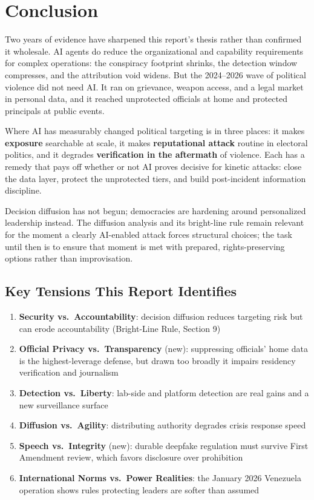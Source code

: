 \documentclass[11pt,letterpaper]{article}
\begin{document}
\section{Conclusion}

Two years of evidence have sharpened this report's thesis rather than confirmed it wholesale. AI agents do reduce the organizational and capability requirements for complex operations: the conspiracy footprint shrinks, the detection window compresses, and the attribution void widens. But the 2024--2026 wave of political violence did not need AI. It ran on grievance, weapon access, and a legal market in personal data, and it reached unprotected officials at home and protected principals at public events.

Where AI has measurably changed political targeting is in three places: it makes \textbf{exposure} searchable at scale, it makes \textbf{reputational attack} routine in electoral politics, and it degrades \textbf{verification in the aftermath} of violence. Each has a remedy that pays off whether or not AI proves decisive for kinetic attacks: close the data layer, protect the unprotected tiers, and build post-incident information discipline.

Decision diffusion has not begun; democracies are hardening around personalized leadership instead. The diffusion analysis and its bright-line rule remain relevant for the moment a clearly AI-enabled attack forces structural choices; the task until then is to ensure that moment is met with prepared, rights-preserving options rather than improvisation.

\subsection{Key Tensions This Report Identifies}

\begin{enumerate}
  \item \textbf{Security vs.\ Accountability}: decision diffusion reduces targeting risk but can erode accountability (Bright-Line Rule, Section 9)
  \item \textbf{Official Privacy vs.\ Transparency} (new): suppressing officials' home data is the highest-leverage defense, but drawn too broadly it impairs residency verification and journalism
  \item \textbf{Detection vs.\ Liberty}: lab-side and platform detection are real gains and a new surveillance surface
  \item \textbf{Diffusion vs.\ Agility}: distributing authority degrades crisis response speed
  \item \textbf{Speech vs.\ Integrity} (new): durable deepfake regulation must survive First Amendment review, which favors disclosure over prohibition
  \item \textbf{International Norms vs.\ Power Realities}: the January 2026 Venezuela operation shows rules protecting leaders are softer than assumed
\end{enumerate}
\end{document}
